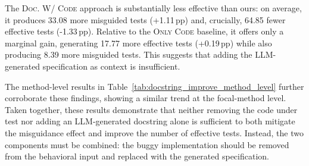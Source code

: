 \documentclass[acmsmall]{acmart}
\begin{document}
The \textsc{Doc. W/ Code} approach is substantially less effective than ours: on average, it produces 33.08 more misguided tests (+1.11\,pp) and, crucially, 64.85 fewer effective tests (-1.33\,pp). Relative to the \textsc{Only Code} baseline, it offers only a marginal gain, generating 17.77 more effective tests (+0.19\,pp) while also producing 8.39 more misguided tests. This suggests that adding the LLM-generated specification as context is insufficient.

The method-level results in Table~\ref{tab:docstring_improve_method_level} further corroborate these findings, showing a similar trend at the focal-method level. Taken together, these results demonstrate that neither removing the code under test nor adding an LLM-generated docstring alone is sufficient to both mitigate the misguidance effect and improve the number of effective tests. Instead, the two components must be combined: the buggy implementation should be removed from the behavioral input and replaced with the generated specification.




\end{document}
